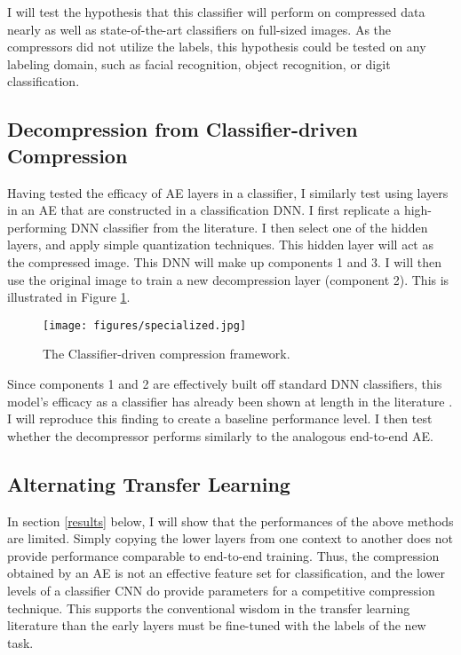 \documentclass[twoside,11pt]{article}
\begin{document}
I will test the hypothesis that this classifier will perform on compressed data 
nearly as well as state-of-the-art classifiers on full-sized images. 
As the compressors did not utilize the labels, this hypothesis could be tested on 
any labeling domain, such as facial recognition, object recognition, or digit classification.

\subsection{Decompression from Classifier-driven Compression} \label{special}

Having tested the efficacy of AE layers in a classifier, I similarly test using layers in an
AE that are constructed in a classification DNN.
I first replicate a high-performing DNN classifier from the literature. 
I then select one of the hidden layers, and apply simple
quantization techniques. This hidden layer 
will act as the compressed image. This DNN will make up components 1 and 3. I 
will then use the original image to train a new decompression layer (component 2).  
This is illustrated in Figure \ref{fig:specialized}.

\begin{figure}[h]
  \texttt{[image: figures/specialized.jpg]}
  \caption{The Classifier-driven compression framework.}
  \label{fig:specialized}
\end{figure}

Since components 1 and 2 are effectively built off standard DNN classifiers, 
this model’s efficacy as a classifier has already been shown at length in the 
literature \citep{krizhevsky2012imagenet}. I will reproduce this finding to create a 
baseline performance level. I then test whether 
the decompressor performs similarly to the analogous end-to-end AE.



\subsection{Alternating Transfer Learning} \label{alternate}

In section \ref{results} below, I will show that the performances of the above methods are limited. 
Simply copying the lower layers from one context to another 
does not provide performance comparable to end-to-end training. 
Thus, the compression obtained by an AE
is not an effective feature set for classification, and the lower levels of a classifier 
CNN do provide parameters for a competitive compression technique. This supports the conventional wisdom 
in the transfer learning literature than the early layers must be fine-tuned with the
labels of the new task.
\end{document}
